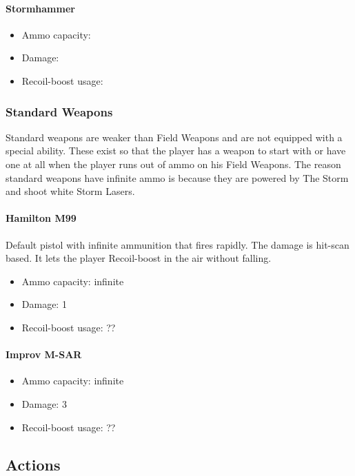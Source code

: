 \documentclass[12pt]{article}
\begin{document}
\paragraph{Stormhammer}

\begin{itemize}
	\item Ammo capacity: 
	\item Damage: 
	\item Recoil-boost usage:
\end{itemize}

\subsubsection{Standard Weapons}

Standard weapons are weaker than Field Weapons and are not equipped with a special ability. These exist so that the player has a weapon to start with or have one at all when the player runs out of ammo on his Field Weapons. The reason standard weapons have infinite ammo is because they are powered by The Storm and shoot white Storm Lasers. 

\paragraph{Hamilton M99} 

Default pistol with infinite ammunition that fires rapidly. The damage is hit-scan based. It lets the player Recoil-boost in the air without falling.

\begin{itemize}
	\item Ammo capacity: infinite
	\item Damage: 1
	\item Recoil-boost usage: ??
\end{itemize}

\paragraph{Improv M-SAR} 

\begin{itemize}
	\item Ammo capacity: infinite
	\item Damage: 3
	\item Recoil-boost usage: ??
\end{itemize}

\subsection{Actions}
\end{document}
